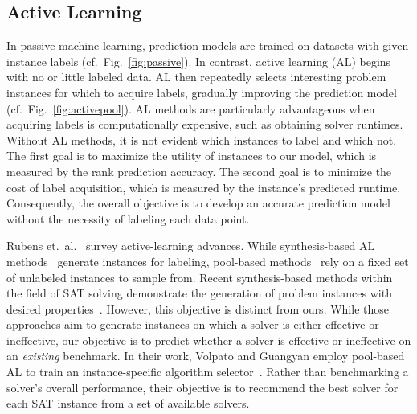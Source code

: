 \documentclass[sn-basic, Numbered]{sn-jnl} %
\begin{document}
\subsection{Active Learning}
\label{sec:related:active-learning}

In passive machine learning, prediction models are trained on datasets with given instance labels (cf.~Fig.~\ref{fig:passive}).
In contrast, active learning (AL) begins with no or little labeled data.
AL then repeatedly selects interesting problem instances for which to acquire labels, gradually improving the prediction model (cf.~Fig.~\ref{fig:activepool}).
AL methods are particularly advantageous when acquiring labels is computationally expensive, such as obtaining solver runtimes.
Without AL methods, it is not evident which instances to label and which not.
The first goal is to maximize the utility of instances to our model, which is measured by the rank prediction accuracy.
The second goal is to minimize the cost of label acquisition, which is measured by the instance's predicted runtime.
Consequently, the overall objective is to develop an accurate prediction model without the necessity of labeling each data point.

Rubens et.~al.~\cite{RubensESK15} survey active-learning advances.
While synthesis-based AL methods~\cite{0001AEMN22,GarzonMG22,2019gaal} generate instances for labeling, pool-based methods~\cite{GolbandiKL11,HarpaleY08,KorenBV09} rely on a fixed set of unlabeled instances to sample from.
Recent synthesis-based methods within the field of SAT solving demonstrate the generation of problem instances with desired properties~\cite{0001AEMN22,GarzonMG22}.
However, this objective is distinct from ours.
While those approaches aim to generate instances on which a solver is either effective or ineffective, our objective is to predict whether a solver is effective or ineffective on an \emph{existing} benchmark.
In their work, Volpato and Guangyan employ pool-based AL to train an instance-specific algorithm selector~\cite{volpato2019active}.
Rather than benchmarking a solver's overall performance, their objective is to recommend the best solver for each SAT instance from a set of available solvers.
\end{document}
